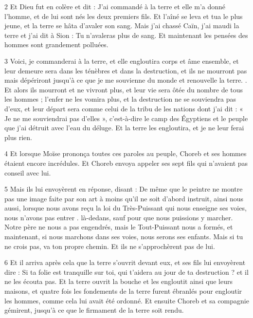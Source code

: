 \par 2 Et Dieu fut en colère et dit : J'ai commandé à la terre et elle m'a donné l'homme, et de lui sont nés les deux premiers fils. Et l'aîné se leva et tua le plus jeune, et la terre se hâta d'avaler son sang. Mais j'ai chassé Caïn, j'ai maudi la terre et j'ai dit à Sion : Tu n'avaleras plus de sang. Et maintenant les pensées des hommes sont grandement polluées.

\par 3 Voici, je commanderai à la terre, et elle engloutira corps et âme ensemble, et leur demeure sera dans les ténèbres et dans la destruction, et ils ne mourront pas mais dépériront jusqu'à ce que je me souvienne du monde et renouvelle la terre. . Et alors ils mourront et ne vivront plus, et leur vie sera ôtée du nombre de tous les hommes ; l’enfer ne les vomira plus, et la destruction ne se souviendra pas d’eux, et leur départ sera comme celui de la tribu de les nations dont j'ai dit : « Je ne me souviendrai pas d'elles », c'est-à-dire le camp des Égyptiens et le peuple que j'ai détruit avec l'eau du déluge. Et la terre les engloutira, et je ne leur ferai plus rien.

\par 4 Et lorsque Moïse prononça toutes ces paroles au peuple, Choreb et ses hommes étaient encore incrédules. Et Choreb envoya appeler ses sept fils qui n'avaient pas conseil avec lui.

\par 5 Mais ils lui envoyèrent en réponse, disant : De même que le peintre ne montre pas une image faite par son art à moins qu'il ne soit d'abord instruit, ainsi nous aussi, lorsque nous avons reçu la loi du Très-Puissant qui nous enseigne ses voies, nous n'avons pas entrer . là-dedans, sauf pour que nous puissions y marcher. Notre père ne nous a pas engendrés, mais le Tout-Puissant nous a formés, et maintenant, si nous marchons dans ses voies, nous serons ses enfants. Mais si tu ne crois pas, va ton propre chemin. Et ils ne s'approchèrent pas de lui.

\par 6 Et il arriva après cela que la terre s'ouvrit devant eux, et ses fils lui envoyèrent dire : Si ta folie est tranquille sur toi, qui t'aidera au jour de ta destruction ? et il ne les écouta pas. Et la terre ouvrit la bouche et les engloutit ainsi que leurs maisons, et quatre fois les fondements de la terre furent ébranlés pour engloutir les hommes, comme cela lui avait été ordonné. Et ensuite Choreb et sa compagnie gémirent, jusqu'à ce que le firmament de la terre soit rendu.

